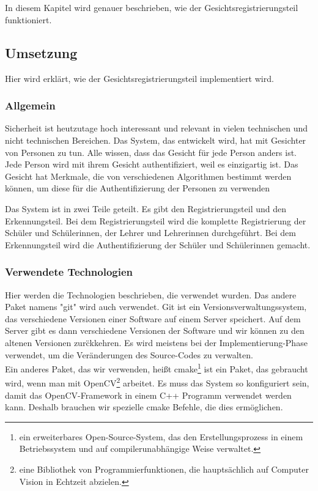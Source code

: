 \chapter{\docname}
In diesem Kapitel wird genauer beschrieben, wie der Gesichtsregistrierungsteil funktioniert.
\label{\docname}
\section{Umsetzung}
Hier wird erkl\"art, wie der Gesichtsregistrierungsteil implementiert wird. 
\subsection{Allgemein}
Sicherheit ist heutzutage hoch interessant und relevant in vielen technischen und nicht technischen Bereichen. Das System, das entwickelt wird, hat mit Gesichter von Personen zu tun. Alle wissen, dass das Gesicht f\"ur jede Person anders ist. Jede Person wird mit ihrem Gesicht authentifiziert, weil es einzigartig ist. Das Gesicht hat Merkmale, die von verschiedenen Algorithmen bestimmt werden k\"onnen, um diese f\"ur die Authentifizierung der Personen zu verwenden 

Das System ist in zwei Teile geteilt. Es gibt den Registrierungsteil und den Erkennungsteil. Bei dem Registrierungsteil wird die komplette Registrierung der Sch\"uler und Sch\"ulerinnen, der Lehrer und Lehrerinnen durchgef\"uhrt. Bei dem Erkennungsteil wird die Authentifizierung der Sch\"uler und Sch\"ulerinnen gemacht. 
\subsection{Verwendete Technologien}
Hier werden die Technologien beschrieben, die verwendet wurden.
Das andere Paket namens "git" wird auch verwendet. Git ist ein Versionsverwaltungssystem, das verschiedene Versionen einer Software auf einem Server speichert. Auf dem Server gibt es dann verschiedene Versionen der Software und wir k\"onnen zu den altenen Versionen zur\"ckkehren. Es wird meistens bei der Implementierung-Phase verwendet, um die Ver\"anderungen des Source-Codes zu verwalten. \\
Ein anderes Paket, das wir verwenden, hei{\ss}t cmake\footnote{ein erweiterbares Open-Source-System, das den Erstellungsprozess in einem Betriebssystem und auf compilerunabhängige Weise verwaltet.} ist ein Paket, das gebraucht wird, wenn man mit OpenCV\footnote{eine Bibliothek von Programmierfunktionen, die hauptsächlich auf Computer Vision in Echtzeit abzielen.} arbeitet. Es muss das System so konfiguriert sein, damit das OpenCV-Framework in einem C++ Programm verwendet werden kann. Deshalb brauchen wir spezielle cmake Befehle, die dies erm\"oglichen.

